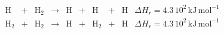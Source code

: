 \begin{equation}
    \begin{array}{lcccccccll}
        \mathrm{H} & + & \mathrm{H}_2   & \rightarrow &\mathrm{H}  & + & \mathrm{H} & + & \mathrm{H} & \Delta H_r = 4.3\,10^{2}\,\mathrm{kJ}\,\mathrm{mol}^{-1} \\
        \mathrm{H}_2  & + & \mathrm{H}_2  & \rightarrow & \mathrm{H} & + &\mathrm{H}_2  & + & \mathrm{H} & \Delta H_r = 4.3\,10^2\,\mathrm{kJ}\,\mathrm{mol}^{-1} \\
    \end{array}
\end{equation}





